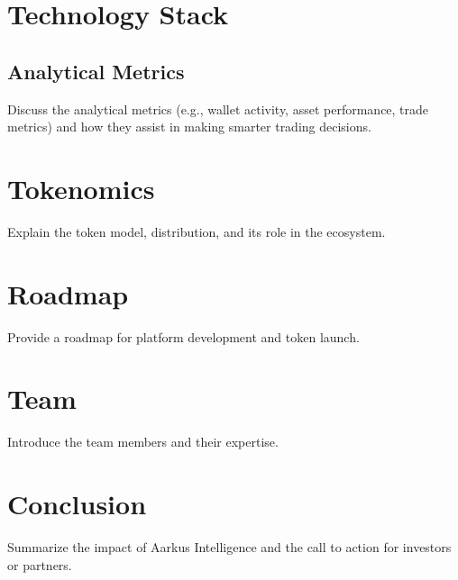\documentclass{article}
\begin{document}
\section{Technology Stack}
\subsection{Analytical Metrics}
Discuss the analytical metrics (e.g., wallet activity, asset performance, trade metrics) and how they assist in making smarter trading decisions.

\section{Tokenomics}
Explain the token model, distribution, and its role in the ecosystem.

\section{Roadmap}
Provide a roadmap for platform development and token launch.

\section{Team}
Introduce the team members and their expertise.

\section{Conclusion}
Summarize the impact of Aarkus Intelligence and the call to action for investors or partners.
\end{document}

